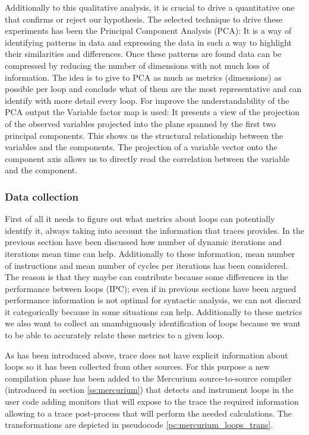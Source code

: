 Additionally to this qualitative analysis, it is crucial to drive a quantitative
one that confirms or reject our hypothesis. The selected technique to drive these
experiments has been the Principal Component Analysis (PCA): It is a way of
identifying patterns in data and expressing the data in such a way to highlight
their similarities and differences. Once these patterns are found data can be
compressed by reducing the number of dimensions with not much loss of
information. The idea is to give to PCA as
much as metrics (dimensions) as possible per loop and conclude what of them are 
the most representative and can identify with more detail every loop. For improve
the understandability of the PCA output the Variable factor map is used: It
presents a view of the projection of the observed variables projected into the
plane spanned by the first two principal components. This shows us the
structural relationship between the variables and the components. The projection
of a variable vector onto the component axis allows us to directly read the
correlation between the variable and the component.

\subsubsection{Data collection}

First of all it needs to figure out what metrics about loops can potentially
identify it, always taking into account the information that traces provides. In
the previous section have been discussed how number of dynamic iterations and
iterations mean time can help. Additionally to these information, mean number of 
instructions and mean number of cycles per iterations has been considered. The
reason is that they maybe can contribute because some differences in the
performance between loops (IPC); even if in previous sections have been argued
performance information is not optimal for syntactic analysis, we can not
discard it categorically because in some situations can help. Additionally to
these metrics we also want to collect an unambiguously identification of loops
because we want to be able to accurately relate these metrics to a given loop.

As has been introduced above, trace does not have explicit information about 
loops so it has been collected from other sources. For this purpose a new
compilation phase has been added to the Mercurium source-to-source compiler
(introduced in section \ref{ss:mercurium}) that detects and instrument loops in
the user
code adding monitors that will expose to the trace the required information
allowing to a trace post-process that will perform the needed calculations. The
transformations are depicted in pseudocode \ref{pc:mercurium_loops_trans}.

